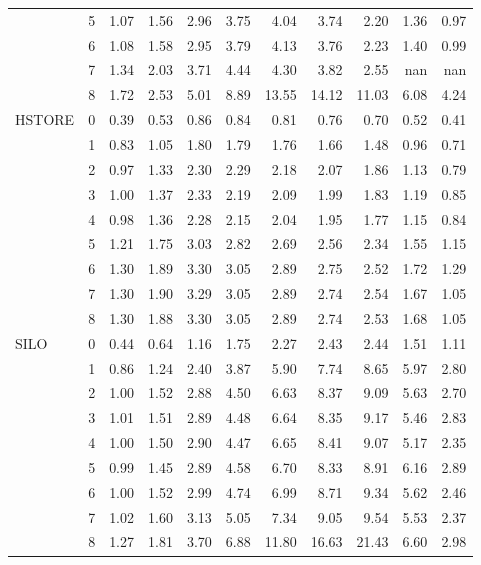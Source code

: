 \begin{tabular}{llrrrrrrrrr}
       & 5 & 1.07 & 1.56 & 2.96 & 3.75 &  4.04 &  3.74 &  2.20 & 1.36 & 0.97 \\
       & 6 & 1.08 & 1.58 & 2.95 & 3.79 &  4.13 &  3.76 &  2.23 & 1.40 & 0.99 \\
       & 7 & 1.34 & 2.03 & 3.71 & 4.44 &  4.30 &  3.82 &  2.55 &  nan &  nan \\
       & 8 & 1.72 & 2.53 & 5.01 & 8.89 & 13.55 & 14.12 & 11.03 & 6.08 & 4.24 \\
HSTORE & 0 & 0.39 & 0.53 & 0.86 & 0.84 &  0.81 &  0.76 &  0.70 & 0.52 & 0.41 \\
       & 1 & 0.83 & 1.05 & 1.80 & 1.79 &  1.76 &  1.66 &  1.48 & 0.96 & 0.71 \\
       & 2 & 0.97 & 1.33 & 2.30 & 2.29 &  2.18 &  2.07 &  1.86 & 1.13 & 0.79 \\
       & 3 & 1.00 & 1.37 & 2.33 & 2.19 &  2.09 &  1.99 &  1.83 & 1.19 & 0.85 \\
       & 4 & 0.98 & 1.36 & 2.28 & 2.15 &  2.04 &  1.95 &  1.77 & 1.15 & 0.84 \\
       & 5 & 1.21 & 1.75 & 3.03 & 2.82 &  2.69 &  2.56 &  2.34 & 1.55 & 1.15 \\
       & 6 & 1.30 & 1.89 & 3.30 & 3.05 &  2.89 &  2.75 &  2.52 & 1.72 & 1.29 \\
       & 7 & 1.30 & 1.90 & 3.29 & 3.05 &  2.89 &  2.74 &  2.54 & 1.67 & 1.05 \\
       & 8 & 1.30 & 1.88 & 3.30 & 3.05 &  2.89 &  2.74 &  2.53 & 1.68 & 1.05 \\
SILO & 0 & 0.44 & 0.64 & 1.16 & 1.75 &  2.27 &  2.43 &  2.44 & 1.51 & 1.11 \\
       & 1 & 0.86 & 1.24 & 2.40 & 3.87 &  5.90 &  7.74 &  8.65 & 5.97 & 2.80 \\
       & 2 & 1.00 & 1.52 & 2.88 & 4.50 &  6.63 &  8.37 &  9.09 & 5.63 & 2.70 \\
       & 3 & 1.01 & 1.51 & 2.89 & 4.48 &  6.64 &  8.35 &  9.17 & 5.46 & 2.83 \\
       & 4 & 1.00 & 1.50 & 2.90 & 4.47 &  6.65 &  8.41 &  9.07 & 5.17 & 2.35 \\
       & 5 & 0.99 & 1.45 & 2.89 & 4.58 &  6.70 &  8.33 &  8.91 & 6.16 & 2.89 \\
       & 6 & 1.00 & 1.52 & 2.99 & 4.74 &  6.99 &  8.71 &  9.34 & 5.62 & 2.46 \\
       & 7 & 1.02 & 1.60 & 3.13 & 5.05 &  7.34 &  9.05 &  9.54 & 5.53 & 2.37 \\
       & 8 & 1.27 & 1.81 & 3.70 & 6.88 & 11.80 & 16.63 & 21.43 & 6.60 & 2.98 \\

\end{tabular}
